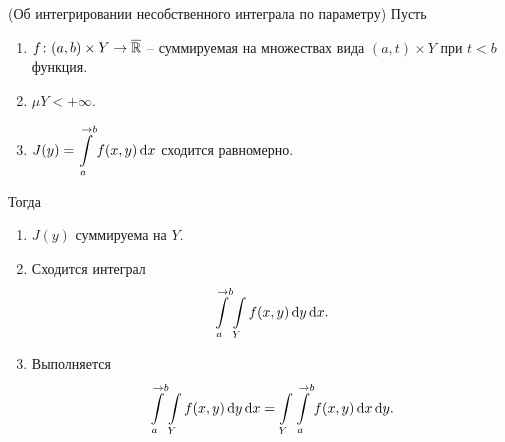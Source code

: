 \begin{theorem}(Об интегрировании несобственного интеграла по параметру)
    Пусть
    \begin{enumerate}
        \item $f \colon (a, b) \times Y \to \overline{\mathbb{R}}$ -- суммируемая на множествах вида $(a, t) \times Y$
            при $t < b$ функция.
        \item $\mu{Y} < +\infty$.
        \item $\displaystyle J(y) = \int\limits_a^{\to b}{f(x, y) \,\mathrm{d} x}$ сходится равномерно.
    \end{enumerate}
    Тогда
    \begin{enumerate}
        \item $J(y)$ суммируема на $Y$. 
        \item Сходится интеграл
            \[
                \int\limits_a^{\to b}{\int\limits_Y{f(x, y) \,\mathrm{d} y} \,\mathrm{d} x} 
            .\]
        \item Выполняется
            \[
                \int\limits_a^{\to b}{\int\limits_Y{f(x, y) \,\mathrm{d} y} \,\mathrm{d} x} 
                = \int\limits_Y{\int\limits_a^{\to b}{f(x, y) \,\mathrm{d} x} \,\mathrm{d} y}
            .\]
    \end{enumerate}
\end{theorem}
